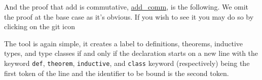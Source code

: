 And the proof that add is commutative, \hyperref[lean:add_comm]{\ttfamily add\_comm}, is the following.
We omit the proof at the base case as it's obvious.
If you wish to see it you may do so by clicking on the git icon

\noindent{}

The tool is again simple, it creates a label to definitions, theorems, inductive types, and type
classes if and only if the declaration starts on a new line with the keyword \texttt{def},
\texttt{theorem}, \texttt{inductive}, and \texttt{class} keyword (respectively) being the first
token of the line and the identifier to be bound is the second token.

